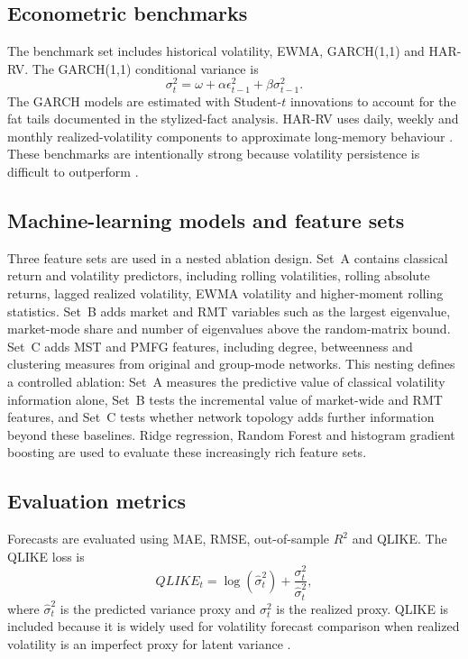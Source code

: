 \subsection{Econometric benchmarks}

The benchmark set includes historical volatility, EWMA, GARCH(1,1) and HAR-RV. The GARCH(1,1) conditional variance is
\begin{equation}
\sigma_t^2 = \omega + \alpha \epsilon_{t-1}^2 + \beta \sigma_{t-1}^2.
\end{equation}
The GARCH models are estimated with Student-$t$ innovations to account for the fat tails documented in the stylized-fact analysis. HAR-RV uses daily, weekly and monthly realized-volatility components to approximate long-memory behaviour \cite{corsi_2009_simple}. These benchmarks are intentionally strong because volatility persistence is difficult to outperform \cite{hansen_lunde_2005}.

\subsection{Machine-learning models and feature sets}

Three feature sets are used in a nested ablation design. Set~A contains classical return and volatility predictors, including rolling volatilities, rolling absolute returns, lagged realized volatility, EWMA volatility and higher-moment rolling statistics. Set~B adds market and RMT variables such as the largest eigenvalue, market-mode share and number of eigenvalues above the random-matrix bound. Set~C adds MST and PMFG features, including degree, betweenness and clustering measures from original and group-mode networks. This nesting defines a controlled ablation: Set~A measures the predictive value of classical volatility information alone, Set~B tests the incremental value of market-wide and RMT features, and Set~C tests whether network topology adds further information beyond these baselines. Ridge regression, Random Forest and histogram gradient boosting are used to evaluate these increasingly rich feature sets.

\subsection{Evaluation metrics}

Forecasts are evaluated using MAE, RMSE, out-of-sample $R^2$ and QLIKE. The QLIKE loss is
\begin{equation}
QLIKE_t = \log(\hat{\sigma}_t^2) + \frac{\sigma_t^2}{\hat{\sigma}_t^2},
\end{equation}
where $\hat{\sigma}_t^2$ is the predicted variance proxy and $\sigma_t^2$ is the realized proxy. QLIKE is included because it is widely used for volatility forecast comparison when realized volatility is an imperfect proxy for latent variance \cite{patton_2011_volatility}.
